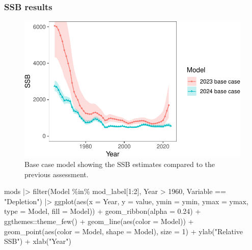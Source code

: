 \documentclass[
  letterpaper,
  DIV=11,
  numbers=noendperiod]{scrartcl}
\newenvironment{Shaded}{\begin{snugshade}}{\end{snugshade}}
\newcommand{\AttributeTok}[1]{\textcolor[rgb]{0.40,0.45,0.13}{#1}}
\newcommand{\DecValTok}[1]{\textcolor[rgb]{0.68,0.00,0.00}{#1}}
\newcommand{\FloatTok}[1]{\textcolor[rgb]{0.68,0.00,0.00}{#1}}
\newcommand{\FunctionTok}[1]{\textcolor[rgb]{0.28,0.35,0.67}{#1}}
\newcommand{\NormalTok}[1]{\textcolor[rgb]{0.00,0.23,0.31}{#1}}
\newcommand{\SpecialCharTok}[1]{\textcolor[rgb]{0.37,0.37,0.37}{#1}}
\newcommand{\StringTok}[1]{\textcolor[rgb]{0.13,0.47,0.30}{#1}}
\begin{document}
\subsubsection{SSB results}\label{ssb-results}

\begin{figure}[H]

{\centering \includegraphics{00-Namibian_hake_model_2024_files/figure-pdf/fitssb-1.pdf}

}

\caption{Base case model showing the SSB estimates compared to the
previous assessment.}

\end{figure}%

\begin{Shaded}
\begin{Highlighting}[]
\NormalTok{mods }\SpecialCharTok{|\textgreater{}}
    \FunctionTok{filter}\NormalTok{(Model }\SpecialCharTok{\%in\%}\NormalTok{ mod\_label[}\DecValTok{1}\SpecialCharTok{:}\DecValTok{2}\NormalTok{], Year }\SpecialCharTok{\textgreater{}} \DecValTok{1960}\NormalTok{, Variable }\SpecialCharTok{==} \StringTok{"Depletion"}\NormalTok{) }\SpecialCharTok{|\textgreater{}}
    \FunctionTok{ggplot}\NormalTok{(}\FunctionTok{aes}\NormalTok{(}\AttributeTok{x =}\NormalTok{ Year, }\AttributeTok{y =}\NormalTok{ value, }\AttributeTok{ymin =}\NormalTok{ ymin, }\AttributeTok{ymax =}\NormalTok{ ymax, }\AttributeTok{type =}\NormalTok{ Model, }\AttributeTok{fill =}\NormalTok{ Model)) }\SpecialCharTok{+}
    \FunctionTok{geom\_ribbon}\NormalTok{(}\AttributeTok{alpha =} \FloatTok{0.24}\NormalTok{) }\SpecialCharTok{+}\NormalTok{ ggthemes}\SpecialCharTok{::}\FunctionTok{theme\_few}\NormalTok{() }\SpecialCharTok{+} \FunctionTok{geom\_line}\NormalTok{(}\FunctionTok{aes}\NormalTok{(}\AttributeTok{color =}\NormalTok{ Model)) }\SpecialCharTok{+}
    \FunctionTok{geom\_point}\NormalTok{(}\FunctionTok{aes}\NormalTok{(}\AttributeTok{color =}\NormalTok{ Model, }\AttributeTok{shape =}\NormalTok{ Model), }\AttributeTok{size =} \DecValTok{1}\NormalTok{) }\SpecialCharTok{+} \FunctionTok{ylab}\NormalTok{(}\StringTok{"Relative SSB"}\NormalTok{) }\SpecialCharTok{+}
    \FunctionTok{xlab}\NormalTok{(}\StringTok{"Year"}\NormalTok{)}
\end{Highlighting}
\end{Shaded}
\end{document}
